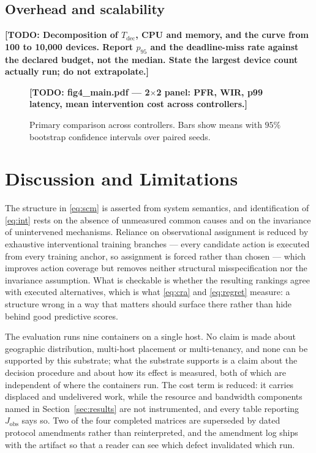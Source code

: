\documentclass[journal]{IEEEtran}
\newcommand{\TODO}[1]{\textbf{[TODO: #1]}}
\begin{document}
\subsection{Overhead and scalability}
\TODO{Decomposition of $T_{\mathrm{dec}}$, CPU and memory, and the curve from
100 to 10{,}000 devices. Report $p_{95}$ and the deadline-miss rate against the
declared budget, not the median. State the largest device count actually run; do
not extrapolate.}

\begin{figure}[!t]
\centering
\TODO{fig4\_main.pdf --- 2$\times$2 panel: PFR, WIR, p99 latency, mean
intervention cost across controllers.}
\caption{Primary comparison across controllers. Bars show means with $95\%$
bootstrap confidence intervals over paired seeds.}
\label{fig:main}
\end{figure}

\section{Discussion and Limitations}
\label{sec:discussion}

The structure in \eqref{eq:scm} is asserted from system semantics, and
identification of \eqref{eq:int} rests on the absence of unmeasured common
causes and on the invariance of unintervened mechanisms. Reliance on
observational assignment is reduced by exhaustive interventional training
branches --- every candidate action is executed from every training anchor, so
assignment is forced rather than chosen --- which improves action coverage but
removes neither structural misspecification nor the invariance assumption. What is checkable is whether the resulting rankings agree with
executed alternatives, which is what \eqref{eq:cra} and \eqref{eq:regret}
measure: a structure wrong in a way that matters should surface there rather
than hide behind good predictive scores.

The evaluation runs nine containers on a single host. No claim is made about
geographic distribution, multi-host placement or multi-tenancy, and none can be
supported by this substrate; what the substrate supports is a claim about the
decision procedure and about how its effect is measured, both of which are
independent of where the containers run. The cost term is reduced: it carries
displaced and undelivered work, while the resource and bandwidth components
named in Section~\ref{sec:results} are not instrumented, and every table
reporting $J_{\mathrm{obs}}$ says so. Two of the four completed matrices are
superseded by dated protocol amendments rather than reinterpreted, and the
amendment log ships with the artifact so that a reader can see which defect
invalidated which run.
\end{document}
